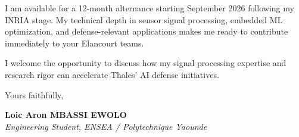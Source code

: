\documentclass[a4paper,11pt]{article}
\begin{document}
I am available for a 12-month alternance starting September 2026 following my INRIA stage. My technical depth in sensor signal processing, embedded ML optimization, and defense-relevant applications makes me ready to contribute immediately to your Elancourt teams.

I welcome the opportunity to discuss how my signal processing expertise and research rigor can accelerate Thales' AI defense initiatives.

Yours faithfully,

\vspace{0.8cm}

\textbf{Loic Aron MBASSI EWOLO}\\
\textit{Engineering Student, ENSEA / Polytechnique Yaounde}
\end{document}

